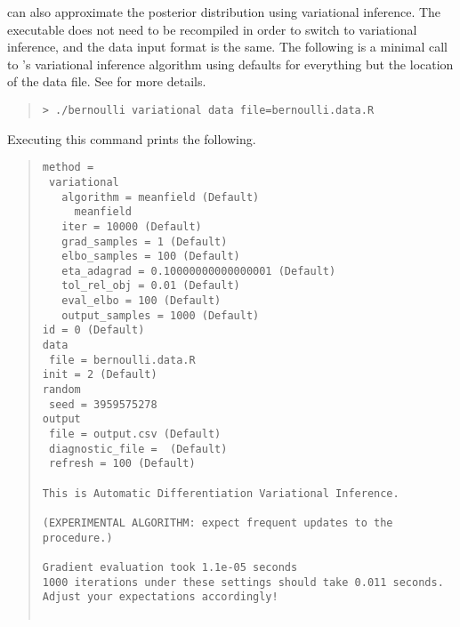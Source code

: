 \CmdStan can also approximate the posterior distribution using variational
inference. The executable does not need to be
recompiled in order to switch to variational inference, and the
data input format is the same. The following is a minimal call to
\Stan's variational inference algorithm using defaults for everything but the
location of the data file. See  for more
details.
%
\begin{quote}
\begin{Verbatim}[fontshape=sl]
> ./bernoulli variational data file=bernoulli.data.R
\end{Verbatim}
\end{quote}
%
Executing this command prints the following.
%
\begin{quote}
\begin{Verbatim}[fontsize=\footnotesize]
method =
 variational
   algorithm = meanfield (Default)
     meanfield
   iter = 10000 (Default)
   grad_samples = 1 (Default)
   elbo_samples = 100 (Default)
   eta_adagrad = 0.10000000000000001 (Default)
   tol_rel_obj = 0.01 (Default)
   eval_elbo = 100 (Default)
   output_samples = 1000 (Default)
id = 0 (Default)
data
 file = bernoulli.data.R
init = 2 (Default)
random
 seed = 3959575278
output
 file = output.csv (Default)
 diagnostic_file =  (Default)
 refresh = 100 (Default)

This is Automatic Differentiation Variational Inference.

(EXPERIMENTAL ALGORITHM: expect frequent updates to the procedure.)

Gradient evaluation took 1.1e-05 seconds
1000 iterations under these settings should take 0.011 seconds.
Adjust your expectations accordingly!


\end{Verbatim}
\end{quote}
